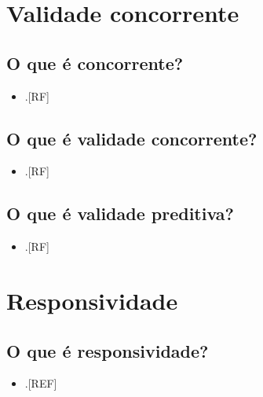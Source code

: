 \documentclass[
  a4paper,
]{book}
\providecommand{\tightlist}{%
  \setlength{\itemsep}{0pt}\setlength{\parskip}{0pt}}
\begin{document}
\hypertarget{validade-concorrente}{%
\section{Validade concorrente}\label{validade-concorrente}}

\hypertarget{o-que-uxe9-concorrente}{%
\subsection{O que é concorrente?}\label{o-que-uxe9-concorrente}}

\begin{itemize}
\tightlist
\item
  .{[}RF{]}
\end{itemize}

\hypertarget{o-que-uxe9-validade-concorrente}{%
\subsection{O que é validade concorrente?}\label{o-que-uxe9-validade-concorrente}}

\begin{itemize}
\tightlist
\item
  .{[}RF{]}
\end{itemize}

\hypertarget{o-que-uxe9-validade-preditiva}{%
\subsection{O que é validade preditiva?}\label{o-que-uxe9-validade-preditiva}}

\begin{itemize}
\tightlist
\item
  .{[}RF{]}
\end{itemize}

\hypertarget{responsividade}{%
\section{Responsividade}\label{responsividade}}

\hypertarget{o-que-uxe9-responsividade}{%
\subsection{O que é responsividade?}\label{o-que-uxe9-responsividade}}

\begin{itemize}
\tightlist
\item
  .{[}REF{]}
\end{itemize}
\end{document}
